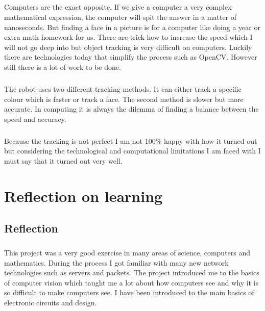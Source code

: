 \documentclass[12pt,a4paper]{report}
\begin{document}
\paragraph{}
Computers are the exact opposite. If we give a computer a very complex mathematical expression, the computer will spit the answer in a matter of nanoseconds. But finding a face in a picture is for a computer like doing a year or extra math homework for us. There are trick how to increase the speed which I will not go deep into but object tracking is very difficult on computers. Luckily there are technologies today that simplify the process such as OpenCV. However still there is a lot of work to be done.

\paragraph{}
The robot uses two different tracking methods. It can either track a specific colour which is faster or track a face. The second method is slower but more accurate. In computing it is always the dilemma of finding a balance between the speed and accuracy. 

\paragraph{}
Because the tracking is not perfect I am not 100\% happy with how it turned out but considering the technological and computational limitations I am faced with I must say that it turned out very well.



\chapter{Reflection on learning}

\section{Reflection}

\paragraph{}
This project was a very good exercise in many areas of science, computers and mathematics. During the process I got familiar with many new network technologies such as servers and packets. The project introduced me to the basics of computer vision which taught me a lot about how computers see and why it is so difficult to make computers see. I have been introduced to the main basics of electronic circuits and design.
\end{document}
